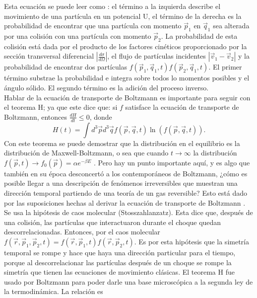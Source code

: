 Esta ecuación se puede leer como \cite{KardarStat}: el término a la izquierda describe el movimiento de una partícula en un potencial U, el término de la derecha es la probabilidad de encontrar que una partícula con momento $\vec{p}_{1}$ en $\vec{q}_{1}$ sea alterada por una colisión con una partícula con momento $\vec{p}_{2}$.  La probabilidad de esta colisión está dada por el producto de los factores cinéticos proporcionado por la sección transversal diferencial $ |\frac{d \sigma}{d \Omega}|$, el flujo de partículas incidentes $|\vec{v}_{1}-\vec{v}_{2}|$ y la probabilidad de encontrar dos partículas $f(\vec{p}_{1},\vec{q}_{1},t)f(\vec{p}_{2},\vec{q}_{1},t)$. El primer término substrae la probabilidad e integra sobre todos lo momentos posibles y el ángulo sólido. El segundo término es la adición del proceso inverso. 
\\
Hablar de la ecuación de transporte de Boltzmann es importante para seguir con el teorema H; ya que este dice que: si $f$ satisface la ecuación de transporte de Boltzmann, entonces $\frac{dH}{dt} \leq 0$, donde 
\begin{equation}
H(t)= \int d^{3} \vec{p} d^{3} \vec{q}  f(\vec{p},\vec{q},t) \ln (f(\vec{p},\vec{q},t)).
\end{equation}
Con este teorema se puede demostrar que la distribución en el equilibrio es la distribución de Maxwell-Boltzmann, o sea que cuando $t \to \infty$ la distribución  $f(\vec{p},t) \to f_{0}(\vec{p})=  \alpha e^{-\beta E}$ \cite{HuangStat}. Pero hay un punto importante aquí, y es algo que también en su época desconcertó a los contemporáneos de Boltzmann, ¿cómo es posible llegar a una descripción de fenómenos irreversibles que muestran una dirección temporal partiendo de una teoría de un gas reversible? Esto está dado por las suposiciones hechas al derivar la ecuación de transporte de Boltzmann \cite{Ehrenfest}.
\\
Se usa la hipótesis de caos molecular (Stosszahlanzatz). Esta dice que, después de una colisión, las partículas que interactuaron durante el choque quedan descorrelacionadas. Entonces, por el caos molecular $f(\vec{r},\vec{p}_{1},\vec{p}_{2},t)=f(\vec{r},\vec{p}_{1},t)f(\vec{r},\vec{p}_{2},t)$. Es por esta hipótesis que la simetría temporal se rompe y hace que haya una dirección particular para el tiempo, porque al descorrelacionar las partículas después de un choque se rompe la simetría que tienen las ecuaciones de movimiento clásicas.
El teorema H fue usado por Boltzmann para poder darle una base microscópica a la segunda ley de la termodinámica. La relación es 
